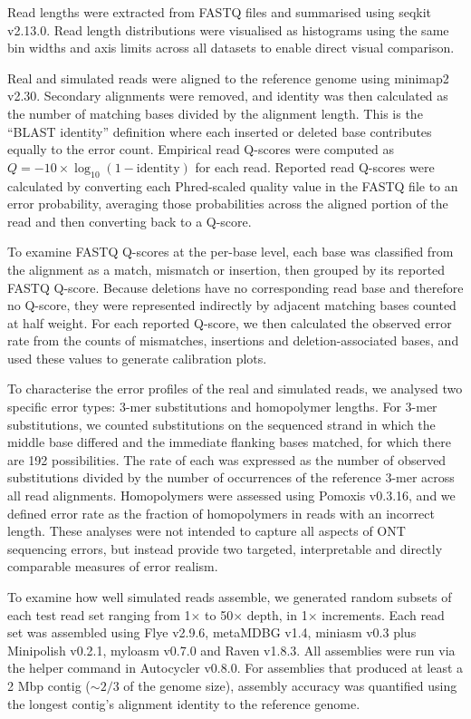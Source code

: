 \documentclass[webpdf,modern,large]{biorxiv}
\begin{document}
Read lengths were extracted from FASTQ files and summarised using seqkit v2.13.0\cite{shen2016seqkit}. Read length distributions were visualised as histograms using the same bin widths and axis limits across all datasets to enable direct visual comparison.

Real and simulated reads were aligned to the reference genome using minimap2 v2.30\cite{li2018minimap2}. Secondary alignments were removed, and identity was then calculated as the number of matching bases divided by the alignment length. This is the ``BLAST identity'' definition where each inserted or deleted base contributes equally to the error count\cite{li2018identity}. Empirical read Q-scores were computed as $Q = -10 \times \log_{10}(1 - \text{identity})$ for each read. Reported read Q-scores were calculated by converting each Phred-scaled quality value in the FASTQ file to an error probability, averaging those probabilities across the aligned portion of the read and then converting back to a Q-score.

To examine FASTQ Q-scores at the per-base level, each base was classified from the alignment as a match, mismatch or insertion, then grouped by its reported FASTQ Q-score. Because deletions have no corresponding read base and therefore no Q-score, they were represented indirectly by adjacent matching bases counted at half weight. For each reported Q-score, we then calculated the observed error rate from the counts of mismatches, insertions and deletion-associated bases, and used these values to generate calibration plots.

To characterise the error profiles of the real and simulated reads, we analysed two specific error types: 3-mer substitutions and homopolymer lengths. For 3-mer substitutions, we counted substitutions on the sequenced strand in which the middle base differed and the immediate flanking bases matched, for which there are 192 possibilities. The rate of each was expressed as the number of observed substitutions divided by the number of occurrences of the reference 3-mer across all read alignments. Homopolymers were assessed using Pomoxis v0.3.16\cite{pomoxis}, and we defined error rate as the fraction of homopolymers in reads with an incorrect length. These analyses were not intended to capture all aspects of ONT sequencing errors, but instead provide two targeted, interpretable and directly comparable measures of error realism.

To examine how well simulated reads assemble, we generated random subsets of each test read set ranging from 1$\times$ to 50$\times$ depth, in 1$\times$ increments. Each read set was assembled using Flye v2.9.6\cite{kolmogorov2019assembly}, metaMDBG v1.4\cite{benoit2026high}, miniasm v0.3\cite{li2016minimap} plus Minipolish v0.2.1, myloasm v0.7.0\cite{shaw2026high} and Raven v1.8.3\cite{vaser2021time}. All assemblies were run via the helper command in Autocycler v0.8.0\cite{wick2025autocycler}. For assemblies that produced at least a 2 Mbp contig ($\sim2/3$ of the genome size), assembly accuracy was quantified using the longest contig's alignment identity to the reference genome.
\end{document}
